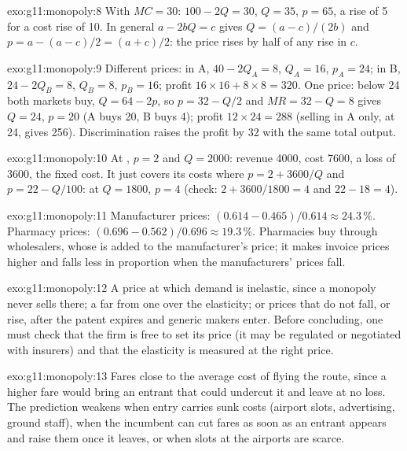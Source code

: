 \begin{solution}{exo:g11:monopoly:8}
With $\mathit{MC} = 30$: $100 - 2Q = 30$, $Q = 35$, $p = 65$, a rise of 5 for a cost rise of 10. In general $a - 2bQ = c$ gives $Q = (a - c)/(2b)$ and $p = a - (a - c)/2 = (a + c)/2$:
the price rises by half of any rise in $c$.
\end{solution}

\begin{solution}{exo:g11:monopoly:9}
Different prices: in A, $40 - 2Q_A = 8$, $Q_A = 16$, $p_A = 24$; in B, $24 - 2Q_B = 8$, $Q_B = 8$, $p_B = 16$; profit $16 \times 16 + 8 \times 8 = 320$. One price: below 24 both
markets buy, $Q = 64 - 2p$, so $p = 32 - Q/2$ and $\mathit{MR} = 32 - Q = 8$ gives $Q = 24$, $p = 20$ (A buys 20, B buys 4); profit $12 \times 24 = 288$ (selling in A only, at 24,
gives 256). Discrimination raises the profit by 32 with the same total output.
\end{solution}

\begin{solution}{exo:g11:monopoly:10}
At , $p = 2$ and $Q = 2000$: revenue 4000, cost 7600, a loss of 3600, the fixed cost. It just covers its costs where $p = 2 + 3600/Q$ and $p = 22 - Q/100$: at $Q =
1800$, $p = 4$ (check: $2 + 3600/1800 = 4$ and $22 - 18 = 4$).
\end{solution}

\begin{solution}{exo:g11:monopoly:11}
Manufacturer prices: $(0.614 - 0.465)/0.614 \approx 24.3\,\%$. Pharmacy prices: $(0.696 - 0.562)/0.696 \approx 19.3\,\%$. Pharmacies buy through wholesalers, whose  is
added to the manufacturer's price; it makes invoice prices higher and falls less in proportion when the manufacturers' prices fall.
\end{solution}

\begin{solution}{exo:g11:monopoly:12}
A price at which demand is inelastic, since a monopoly never sells there; a  far from one over the elasticity; or prices that do not fall, or rise, after the patent
expires and generic makers enter. Before concluding, one must check that the firm is free to set its price (it may be regulated or negotiated with insurers) and that the
elasticity is measured at the right price.
\end{solution}

\begin{solution}{exo:g11:monopoly:13}
Fares close to the average cost of flying the route, since a higher fare would bring an entrant that could undercut it and leave at no loss. The prediction weakens when
entry carries sunk costs (airport slots, advertising, ground staff), when the incumbent can cut fares as soon as an entrant appears and raise them once it leaves, or when
slots at the airports are scarce.
\end{solution}

